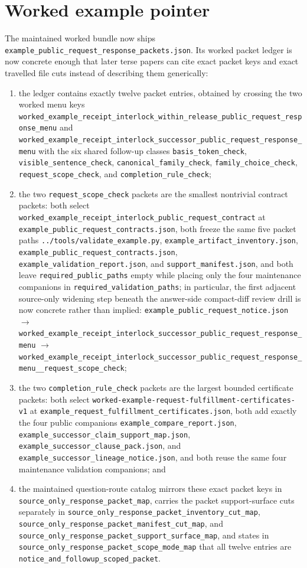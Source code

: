 \documentclass[11pt]{article}
\begin{document}
\section{Worked example pointer}
The maintained worked bundle now ships \nolinkurl{example_public_request_response_packets.json}.\cite{series:workedexample}
Its worked packet ledger is now concrete enough that later terse papers can cite exact packet keys and exact travelled file cuts instead of describing them generically:
\begin{enumerate}[leftmargin=*]
\item the ledger contains exactly twelve packet entries, obtained by crossing the two worked menu keys \nolinkurl{worked_example_receipt_interlock_within_release_public_request_response_menu} and \nolinkurl{worked_example_receipt_interlock_successor_public_request_response_menu} with the six shared follow-up classes \nolinkurl{basis_token_check}, \nolinkurl{visible_sentence_check}, \nolinkurl{canonical_family_check}, \nolinkurl{family_choice_check}, \nolinkurl{request_scope_check}, and \nolinkurl{completion_rule_check};
\item the two \nolinkurl{request_scope_check} packets are the smallest nontrivial contract packets: both select \nolinkurl{worked_example_receipt_interlock_public_request_contract} at \nolinkurl{example_public_request_contracts.json}, both freeze the same five packet paths \nolinkurl{../tools/validate_example.py}, \nolinkurl{example_artifact_inventory.json}, \nolinkurl{example_public_request_contracts.json}, \nolinkurl{example_validation_report.json}, and \nolinkurl{support_manifest.json}, and both leave \nolinkurl{required_public_paths} empty while placing only the four maintenance companions in \nolinkurl{required_validation_paths}; in particular, the first adjacent source-only widening step beneath the answer-side compact-diff review drill is now concrete rather than implied: \nolinkurl{example_public_request_notice.json} $\to$ \nolinkurl{worked_example_receipt_interlock_successor_public_request_response_menu} $\to$ \nolinkurl{worked_example_receipt_interlock_successor_public_request_response_menu__request_scope_check};
\item the two \nolinkurl{completion_rule_check} packets are the largest bounded certificate packets: both select \nolinkurl{worked-example-request-fulfillment-certificates-v1} at \nolinkurl{example_request_fulfillment_certificates.json}, both add exactly the four public companions \nolinkurl{example_compare_report.json}, \nolinkurl{example_successor_claim_support_map.json}, \nolinkurl{example_successor_clause_pack.json}, and \nolinkurl{example_successor_lineage_notice.json}, and both reuse the same four maintenance validation companions; and
\item the maintained question-route catalog mirrors these exact packet keys in \nolinkurl{source_only_response_packet_map}, carries the packet support-surface cuts separately in \nolinkurl{source_only_response_packet_inventory_cut_map}, \nolinkurl{source_only_response_packet_manifest_cut_map}, and \nolinkurl{source_only_response_packet_support_surface_map}, and states in \nolinkurl{source_only_response_packet_scope_mode_map} that all twelve entries are \nolinkurl{notice_and_followup_scoped_packet}.
\end{enumerate}
\end{document}
